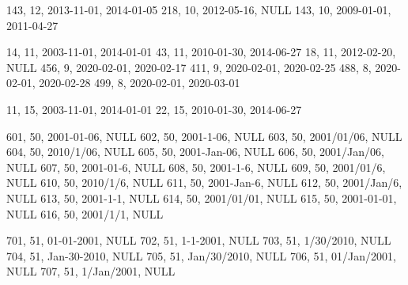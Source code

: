 143, 12, 2013-11-01, 2014-01-05
218, 10, 2012-05-16, NULL
143, 10, 2009-01-01, 2011-04-27

14, 11, 2003-11-01, 2014-01-01
43, 11, 2010-01-30, 2014-06-27
18, 11, 2012-02-20, NULL
456, 9, 2020-02-01, 2020-02-17
411, 9, 2020-02-01, 2020-02-25
488, 8, 2020-02-01, 2020-02-28
499, 8, 2020-02-01, 2020-03-01

11, 15, 2003-11-01, 2014-01-01
22, 15, 2010-01-30, 2014-06-27

601, 50, 2001-01-06, NULL
602, 50, 2001-1-06, NULL
603, 50, 2001/01/06, NULL
604, 50, 2010/1/06, NULL
605, 50, 2001-Jan-06, NULL
606, 50, 2001/Jan/06, NULL
607, 50, 2001-01-6, NULL
608, 50, 2001-1-6, NULL
609, 50, 2001/01/6, NULL
610, 50, 2010/1/6, NULL
611, 50, 2001-Jan-6, NULL
612, 50, 2001/Jan/6, NULL
613, 50, 2001-1-1, NULL
614, 50, 2001/01/01, NULL
615, 50, 2001-01-01, NULL
616, 50, 2001/1/1, NULL

701, 51, 01-01-2001, NULL
702, 51, 1-1-2001, NULL
703, 51, 1/30/2010, NULL
704, 51, Jan-30-2010, NULL
705, 51, Jan/30/2010, NULL
706, 51, 01/Jan/2001, NULL
707, 51, 1/Jan/2001, NULL